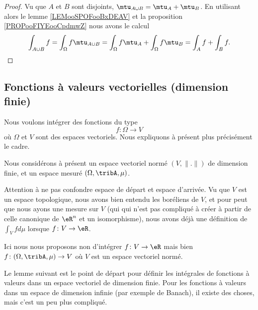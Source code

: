 \begin{proof}
	Vu que \( A\) et \( B\) sont disjoints, \( \mtu_{A\cup B}=\mtu_A+\mtu_B\). En utilisant alors le lemme \ref{LEMooSPOFooBxDEAV} et la proposition \ref{PROPooFIYEooCpdmwZ} nous avons le calcul
	\begin{equation}
		\int_{A\cup B}f=\int_{\Omega}f\mtu_{A\cup B}=\int_{\Omega} f\mtu_A+\int_{\Omega}f\mtu_B=\int_Af+\int_Bf.
	\end{equation}
\end{proof}


\subsection{Fonctions à valeurs vectorielles (dimension finie)}

Nous voulons intégrer des fonctions du type
\begin{equation}
	f \colon \Omega\to V
\end{equation}
où \( \Omega\) et \( V\) sont des espaces vectoriels. Nous expliquons à présent plus précisément le cadre.

\begin{normaltext}      \label{NORMooTQBIooBaScjt}
	Nous considérons à présent un espace vectoriel normé \( (V,\| . \|)\) de dimension finie, et un espace mesuré \( (\Omega,\tribA,\mu)\).

	Attention à ne pas confondre espace de départ et espace d'arrivée. Vu que \( V\) est un espace topologique, nous avons bien entendu les boréliens de \( V\), et pour peut que nous ayons une mesure sur \( V\) (qui qui n'est pas compliqué à créer à partir de celle canonique de \( \eR^n\) et un isomorphisme), nous avons déjà une définition de \( \int_Vfd\mu\) lorsque \( f\colon V\to \eR\).

	Ici nous nous proposons non d'intégrer \( f\colon V\to \eR\) mais bien \( f\colon (\Omega,\tribA,\mu)\to V\) où \( V\) est un espace vectoriel normé.

	Le lemme suivant est le point de départ pour définir les intégrales de fonctions à valeurs dans un espace vectoriel de dimension finie. Pour les fonctions à valeurs dans un espace de dimension infinie (par exemple de Banach), il existe des choses, mais c'est un peu plus compliqué.
\end{normaltext}

